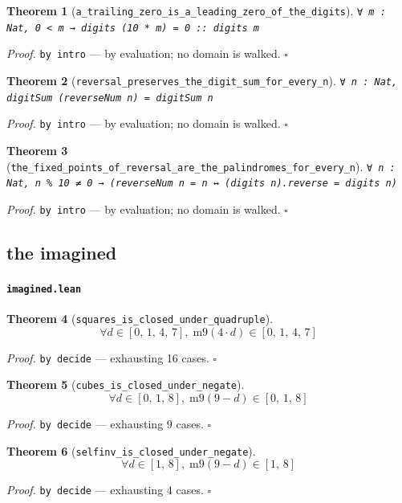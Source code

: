 \documentclass[11pt]{article}
\newtheorem{theorem}{Theorem}[section]
\begin{document}
\begin{theorem}[\texttt{a\_trailing\_zero\_is\_a\_leading\_zero\_of\_the\_digits}]
\texttt{∀ m : Nat, 0 < m → digits (10 * m) = 0 :: digits m}
\end{theorem}
\noindent\emph{Proof.} \texttt{by
  intro} --- by evaluation; no domain is walked. \hfill$\square$

\begin{theorem}[\texttt{reversal\_preserves\_the\_digit\_sum\_for\_every\_n}]
\texttt{∀ n : Nat, digitSum (reverseNum n) = digitSum n}
\end{theorem}
\noindent\emph{Proof.} \texttt{by
  intro} --- by evaluation; no domain is walked. \hfill$\square$

\begin{theorem}[\texttt{the\_fixed\_points\_of\_reversal\_are\_the\_palindromes\_for\_every\_n}]
\texttt{∀ n : Nat, n \% 10 ≠ 0 → (reverseNum n = n ↔ (digits n).reverse = digits n)}
\end{theorem}
\noindent\emph{Proof.} \texttt{by
  intro} --- by evaluation; no domain is walked. \hfill$\square$

\subsection{the imagined}

\paragraph{\texttt{imagined.lean}}

\begin{theorem}[\texttt{squares\_is\_closed\_under\_quadruple}]
\[ \forall d \in [0,\,1,\,4,\,7],\; \mathrm{m9}\mathopen{}\left(4 \cdot d\right) \in [0,\,1,\,4,\,7] \]
\end{theorem}
\noindent\emph{Proof.} \texttt{by decide} --- exhausting 16 cases. \hfill$\square$

\begin{theorem}[\texttt{cubes\_is\_closed\_under\_negate}]
\[ \forall d \in [0,\,1,\,8],\; \mathrm{m9}\mathopen{}\left(9 - d\right) \in [0,\,1,\,8] \]
\end{theorem}
\noindent\emph{Proof.} \texttt{by decide} --- exhausting 9 cases. \hfill$\square$

\begin{theorem}[\texttt{selfinv\_is\_closed\_under\_negate}]
\[ \forall d \in [1,\,8],\; \mathrm{m9}\mathopen{}\left(9 - d\right) \in [1,\,8] \]
\end{theorem}
\noindent\emph{Proof.} \texttt{by decide} --- exhausting 4 cases. \hfill$\square$
\end{document}
